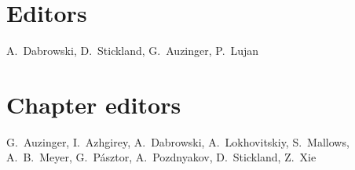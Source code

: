 \section*{Editors}
A.~Dabrowski, D.~Stickland, G.~Auzinger, P.~Lujan
 
\section*{Chapter editors}
G.~Auzinger, I.~Azhgirey,  A.~Dabrowski, A.~Lokhovitskiy,  S.~Mallows, A.~B.~Meyer,  G.~P\'asztor, A.~Pozdnyakov,  D.~Stickland,  Z.~Xie


  
\vspace*{\fill}
\cleardoublepage